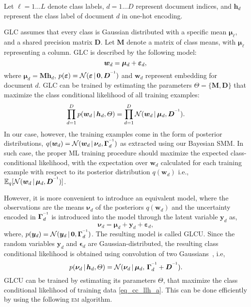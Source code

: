 \documentclass[journal]{IEEEtran}
\newcommand{\mb}[1]{\bm{#1}}
\newcommand{\bs}[1]{\bm{#1}}
\begin{document}
Let \(\ell = 1\ldots L\) denote class labels, \(d=1\ldots D\) represent document indices, and \(\mb{h}_d\) represent the class label of document \(d\) in one-hot encoding.


GLC assumes that every class is Gaussian distributed with a specific mean \(\bs{\mu}_{\ell}\), and a shared precision matrix \(\mb{D}\). Let \(\mb{M}\) denote a matrix of class means, with \(\bs{\mu}_{\ell}\) representing a column. GLC is described by the following model:
\begin{equation}
\label{eq_glc_model}
\mb{w}_d = \bs{\mu}_{d} + \bs{\varepsilon}_d, \\
\end{equation}
where \(\bs{\mu}_{d}=\mb{M} \mb{h}_d\), \(p(\bs{\varepsilon})= \mathcal{N}(\bs{\varepsilon}\,|\, \mb{0}, \mb{D}^{\I})\) and \(\mb{w}_d\) represent embedding for document \(d\). GLC can be trained by estimating the parameters \(\varTheta=\{\mb{M}, \mb{D}\}\) that maximize the class conditional likelihood of all training examples:
\begin{equation}
\label{eq_cc_llh_glc}
\prod_{d=1}^{D} p(\mb{w}_d \,|\, \mb{h}_d, \varTheta) = \prod_{d=1}^{D} \mathcal{N}(\mb{w}_d \,|\, \bs{\mu}_{d}, \mb{D}^{\I}).
\end{equation}
In our case, however, the training examples come in the form of posterior distributions, \(q(\mb{w}_d) = \mathcal{N}(\mb{w}_d\,|\,\bs{\nu}_d, \bs{\Gamma}_d^{\I})\) as extracted using our Bayesian SMM. In such case, the proper ML training procedure should maximize the expected class-conditional likelihood, with the expectation over \(\bs{w}_d\) calculated for each training example with respect to its posterior distribution \(q(\mb{w}_d)\) i.e., \(\mathbb{E}_q[\mathcal{N}(\mb{w}_d \,|\, \bs{\mu}_d, \mb{D}^{\I})]\).

However, it is more convenient to introduce an equivalent model, where the 
observations are the means \(\bs{\nu}_d\) of the posteriors \(q(\mb{w}_d)\) and 
the uncertainty encoded in \(\bs{\Gamma}_d^{\I}\) is introduced into the model 
through the latent variable \(\mb{y}_d\) as,
\begin{equation}
\label{eq_clf_model}
\bs{\nu}_d = \bs{\mu}_{d} + \mb{y}_d + \bs{\varepsilon}_d,
\end{equation}
where, \(p(\mb{y}_d)=\mathcal{N}(\mb{y}_d \,|\, \mb{0}, \bs{\Gamma}_{d}^{\I})\).
The resulting model is called GLCU. Since the random variables \(\mb{y}_d\) and 
\(\bs{\epsilon}_d\) are Gaussian-distributed, the resulting
class conditional likelihood is obtained using convolution of two 
Gaussians~\cite{Bishop:2006:PRML}, i.e,
\begin{equation}
\label{eq_cc_llh_a}
p(\bs{\nu}_d \,|\, \mb{h}_d, \varTheta) =
\mathcal{N}(\bs{\nu}_d \,|\, \bs{\mu}_d,\, \bs{\Gamma}_{d}^{\I}+\mb{D}^{\I}).
\end{equation}
GLCU can be trained by estimating its parameters \(\varTheta\), that maximize 
the class conditional likelihood of training data \eqref{eq_cc_llh_a}. 
This can be done efficiently by using the following \textsc{em} algorithm. 
\end{document}
